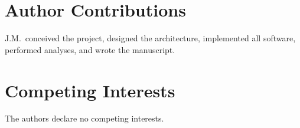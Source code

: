 \documentclass[10pt]{article}
\begin{document}
\section*{Author Contributions}
J.M.\ conceived the project, designed the architecture, implemented all software, performed analyses, and wrote the manuscript.

\section*{Competing Interests}
The authors declare no competing interests.




\clearpage


\end{document}
